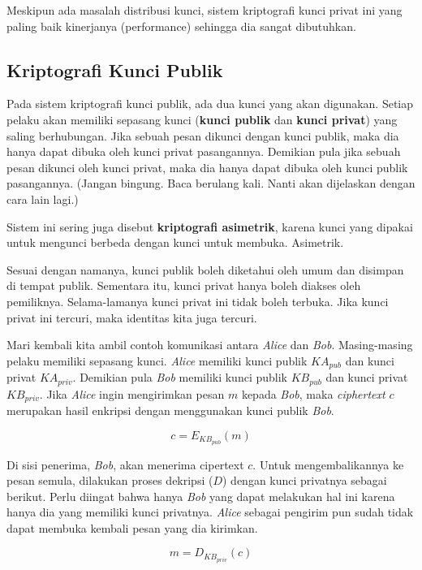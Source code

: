 Meskipun ada masalah distribusi kunci, sistem kriptografi kunci privat ini yang
paling baik kinerjanya (performance) sehingga dia sangat dibutuhkan.


\subsection{Kriptografi Kunci Publik}
Pada sistem kriptografi kunci publik, ada dua kunci yang akan digunakan. Setiap
pelaku akan memiliki sepasang kunci ({\bf kunci publik} dan {\bf kunci privat})
yang saling berhubungan. Jika sebuah pesan dikunci dengan kunci publik, maka
dia hanya dapat dibuka oleh kunci privat pasangannya. Demikian pula jika sebuah
pesan dikunci oleh kunci privat, maka dia hanya dapat dibuka oleh kunci publik
pasangannya. (Jangan bingung. Baca berulang kali. Nanti akan dijelaskan dengan
cara lain lagi.)

Sistem ini sering juga disebut {\bf kriptografi asimetrik}, karena kunci yang
dipakai untuk mengunci berbeda dengan kunci untuk membuka. Asimetrik.

Sesuai dengan namanya, kunci publik boleh diketahui oleh umum dan disimpan di
tempat publik. Sementara itu, kunci privat hanya boleh diakses oleh pemiliknya.
Selama-lamanya kunci privat ini tidak boleh terbuka. Jika kunci privat ini
tercuri, maka identitas kita juga tercuri.

Mari kembali kita ambil contoh komunikasi antara {\em Alice} dan {\em Bob}.
Masing-masing pelaku memiliki sepasang kunci. {\em Alice} memiliki kunci publik
$KA_{pub}$ dan kunci privat $KA_{priv}$. Demikian pula {\em Bob} memiliki kunci
publik $KB_{pub}$ dan kunci privat $KB_{priv}$. Jika {\em Alice} ingin
mengirimkan pesan $m$ kepada {\em Bob}, maka {\em ciphertext} $c$ merupakan
hasil enkripsi dengan menggunakan kunci publik {\em Bob}.

\begin{equation}
   c = E_{KB_{pub}}(m)
\end{equation}

Di sisi penerima, {\em Bob}, akan menerima cipertext $c$. Untuk
mengembalikannya ke pesan semula, dilakukan proses dekripsi ($D$) dengan kunci
privatnya sebagai berikut. Perlu diingat bahwa hanya {\em Bob} yang dapat
melakukan hal ini karena hanya dia yang memiliki kunci privatnya. {\em Alice}
sebagai pengirim pun sudah tidak dapat membuka kembali pesan yang dia kirimkan.

\begin{equation}
   m = D_{KB_{priv}}(c)
\end{equation}

